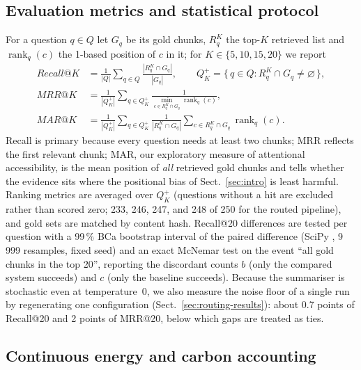 \documentclass[pdflatex,sn-mathphys-num]{sn-jnl}
\makeatletter
\newcommand{\Rec}[1]{Recall@#1}
\newcommand{\MRR}[1]{MRR@#1}
\newcommand{\MAR}[1]{MAR@#1}
\newcommand{\rnk}{\operatorname{rank}}
\theoremstyle{thmstyleone}%
\theoremstyle{thmstylethree}%
\makeatother
\begin{document}
\subsection{Evaluation metrics and statistical protocol}\label{sec:metrics}

For a question $q\in Q$ let $G_q$ be its gold chunks, $R_q^K$ the top-$K$ retrieved list and $\rnk_q(c)$ the 1-based position of $c$ in it; for $K\in\{5,10,15,20\}$ we report
\begin{align}
\Rec{K}&=\frac{1}{|Q|}\sum_{q\in Q}\frac{|R_q^K\cap G_q|}{|G_q|},\qquad
Q_K^{+}=\{\,q\in Q : R_q^K\cap G_q\neq\varnothing\,\},\\
\MRR{K}&=\frac{1}{|Q_K^{+}|}\sum_{q\in Q_K^{+}}\frac{1}{\min_{c\in R_q^K\cap G_q}\rnk_q(c)},\\
\MAR{K}&=\frac{1}{|Q_K^{+}|}\sum_{q\in Q_K^{+}}\frac{1}{|R_q^K\cap G_q|}\sum_{c\in R_q^K\cap G_q}\rnk_q(c).
\end{align}
Recall is primary because every question needs at least two chunks; MRR \cite{voorhees1999trec8} reflects the first relevant chunk; MAR, our exploratory measure of attentional accessibility, is the mean position of \emph{all} retrieved gold chunks and tells whether the evidence sits where the positional bias of Sect.~\ref{sec:intro} is least harmful. Ranking metrics are averaged over $Q_K^{+}$ (questions without a hit are excluded rather than scored zero; 233, 246, 247, and 248 of 250 for the routed pipeline), and gold sets are matched by content hash. \Rec{20} differences are tested per question with a 99\,\% BCa bootstrap interval of the paired difference \cite{efron1987better,smucker2007comparison} (SciPy \cite{virtanen2020scipy}, 9\,999 resamples, fixed seed) and an exact McNemar test \cite{McNemar_1947,dietterich1998approximate} on the event ``all gold chunks in the top 20'', reporting the discordant counts $b$ (only the compared system succeeds) and $c$ (only the baseline succeeds). Because the summariser is stochastic even at temperature~0, we also measure the noise floor of a single run by regenerating one configuration (Sect.~\ref{sec:routing-results}): about 0.7 points of \Rec{20} and 2 points of \MRR{20}, below which gaps are treated as ties.

\subsection{Continuous energy and carbon accounting}\label{sec:energy}
\end{document}
